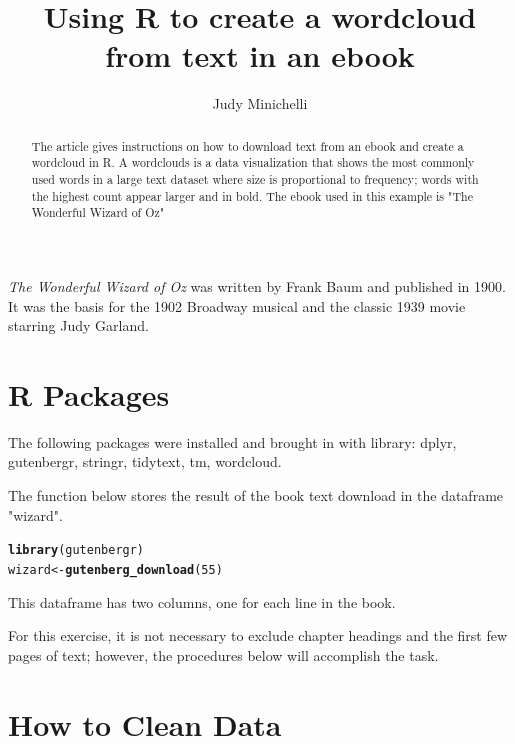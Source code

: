 \documentclass{article}\usepackage[]{graphicx}\usepackage[]{color}
\makeatletter
\newcommand{\hlnum}[1]{\textcolor[rgb]{0.686,0.059,0.569}{#1}}%
\newcommand{\hlstd}[1]{\textcolor[rgb]{0.345,0.345,0.345}{#1}}%
\newcommand{\hlkwb}[1]{\textcolor[rgb]{0.69,0.353,0.396}{#1}}%
\newcommand{\hlkwd}[1]{\textcolor[rgb]{0.737,0.353,0.396}{\textbf{#1}}}%
\newenvironment{kframe}{%
 \def\at@end@of@kframe{}%
 \ifinner\ifhmode%
  \def\at@end@of@kframe{\end{minipage}}%
  \begin{minipage}{\columnwidth}%
 \fi\fi%
 \def\FrameCommand##1{\hskip\@totalleftmargin \hskip-\fboxsep
 \colorbox{shadecolor}{##1}\hskip-\fboxsep
     \hskip-\linewidth \hskip-\@totalleftmargin \hskip\columnwidth}%
 \MakeFramed {\advance\hsize-\width
   \@totalleftmargin\z@ \linewidth\hsize
   \@setminipage}}%
 {\par\unskip\endMakeFramed%
 \at@end@of@kframe}
\newenvironment{knitrout}{}{} %
\makeatother
\begin{document}
\title{Using R to create a wordcloud from text in an ebook}
\author{Judy Minichelli}
\maketitle

\begin{abstract}
The article gives instructions on how to download text from an ebook and create a 
wordcloud in R.  A wordclouds is a data visualization that shows the most commonly used words in a large text dataset where size is proportional to frequency; words with the highest count appear larger and in bold.  The ebook used in this example
is "The Wonderful Wizard of Oz"

\end{abstract}

\textit{The Wonderful Wizard of Oz} was written by Frank Baum and published in 1900. It was the basis for the 1902 Broadway musical and the classic 1939 movie starring Judy Garland. 

\section{R Packages}

The following packages were installed and brought in with library: dplyr, gutenbergr, stringr, tidytext, tm, wordcloud.

    

The function below stores the result of the book text download in the dataframe "wizard". 

\begin{knitrout}
\color{fgcolor}\begin{kframe}
\begin{alltt}
\hlkwd{library}\hlstd{(gutenbergr)}
\hlstd{wizard}\hlkwb{<-}\hlkwd{gutenberg_download}\hlstd{(}\hlnum{55}\hlstd{)}
\end{alltt}
\end{kframe}
\end{knitrout}

This dataframe has two columns, one for each line in the book.

\noindent For this exercise, it is not necessary to exclude chapter headings and the first few pages of text; however, the procedures below will accomplish the task.  

\section{How to Clean Data}
\end{document}

